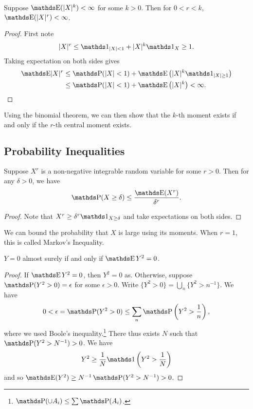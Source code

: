 \documentclass[letterpaper, 10pt]{article}
\begin{document}
\begin{proposition}
  Suppose \(\E(\abs{X}^k) < \infty\) for some \(k > 0\).
  Then for \(0 < r < k\), \(\E(\abs{X}^r) < \infty\).
\end{proposition}
\begin{proof}
  First note
  \[
    \abs{X}^r \leq \ind_{\abs{X} < 1} + \abs{X}^k \ind_{X} \geq 1.  
  \]
  Taking expectation on both sides gives
  \begin{align*}
    \E \abs{X}^r
    &\leq \P(\abs{X} < 1) + \E\left( \abs{X}^k \ind_{\abs{X} \geq 1} \right) \\
    &\leq \P(\abs{X} < 1) + \E\left( \abs{X}^k \right) < \infty.
  \end{align*}
\end{proof}

\begin{remark}
  Using the binomial theorem, we can then show that the \(k\)-th moment exists if and only if the \(r\)-th central moment exists.
\end{remark}



\subsection{Probability Inequalities}
\begin{theorem}
  Suppose \(X^r\) is a non-negative integrable random variable for some \(r > 0\).
  Then for any \(\delta > 0\), we have
  \[
    \P(X \geq \delta) \leq \frac{\E(X^r)}{\delta^r}.
  \]
\end{theorem}
\begin{proof}
  Note that \(X^r \geq \delta^r \ind_{X \geq \delta}\) and take expectations on both sides.
\end{proof}
\begin{remark}
  We can bound the probability that \(X\) is large using its moments.
  When \(r = 1\), this is called Markov's Inequality.
\end{remark}


\begin{lemma}
  \(Y = 0\) almost surely if and only if \(\E Y^2 = 0\).
\end{lemma}
\begin{proof}
  If \(\E Y^2 = 0\), then \(Y^2 = 0\) as.
  Otherwise, suppose \(\P(Y^2 > 0) = \epsilon\) for some \(\epsilon > 0\).
  Write \(\{Y^2 > 0\} = \bigcup_n \{Y^2 > n^{-1}\}\).
  We have
  \[
    0
    < \epsilon
    = \P(Y^2 > 0)
    \leq \sum_n \P\left( Y^2 > \frac{1}{n} \right),
  \]
  where we used Boole's inequality.\footnote{\(\P(\cup A_i) \leq \sum \P(A_i)\).}
  There thus exists \(N\) such that \(\P(Y^2 > N^{-1}) > 0\).
  We have
  \[
    Y^2 \geq \frac{1}{N} \ind\left( Y^2 > \frac{1}{N} \right)
  \]
  and so \(\E(Y^2) \geq N^{-1} \P(Y^2 > N^{-1}) > 0\).
\end{proof}
\end{document}
